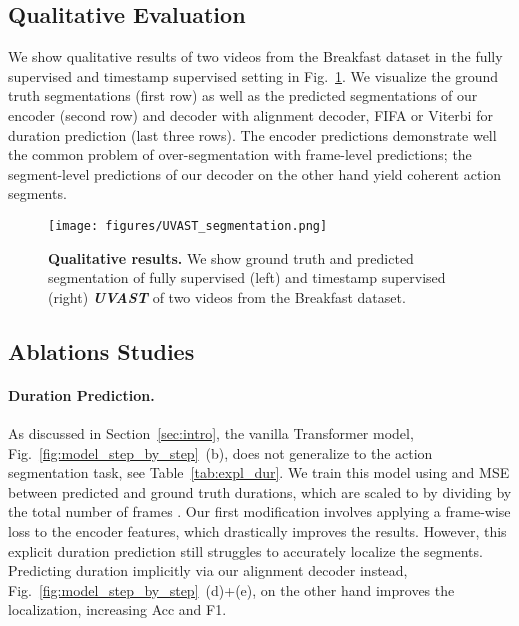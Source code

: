\subsection{Qualitative Evaluation}
We show qualitative results of two videos from the Breakfast dataset in the fully supervised and timestamp supervised setting in  Fig.~\ref{fig:qualitative}. We visualize the ground truth segmentations (first row) as well as the predicted segmentations of our encoder (second row) and decoder with alignment decoder, FIFA or Viterbi for duration prediction (last three rows).
The encoder predictions demonstrate well the common problem of over-segmentation with frame-level predictions; the segment-level predictions of our decoder on the other hand yield coherent action segments.

\begin{figure}
\begin{minipage}{\linewidth}
    \centering
    \texttt{[image: figures/UVAST\_segmentation.png]}
    \caption{\textbf{Qualitative results.} We show ground truth and predicted segmentation of fully supervised (left) and timestamp supervised (right) \textit{\textbf{UVAST}} of two videos from the Breakfast dataset.}
    \label{fig:qualitative}
\end{minipage}
\end{figure}

\subsection{Ablations Studies}
\paragraph{Duration Prediction.}
As discussed in Section~\ref{sec:intro}, the vanilla Transformer model, Fig.~\ref{fig:model_step_by_step}~(b),  does not generalize to the action segmentation task, see Table~\ref{tab:expl_dur}. We train this model using  and MSE between predicted and ground truth durations, which are scaled to  by dividing by the total number of frames .
Our first modification involves applying a frame-wise loss to the encoder features, which drastically improves the results. However, this explicit duration prediction still struggles to accurately localize the segments. 
Predicting duration implicitly via our alignment decoder instead, Fig.~\ref{fig:model_step_by_step}~(d)+(e), on the other hand improves the localization, increasing Acc and F1.

